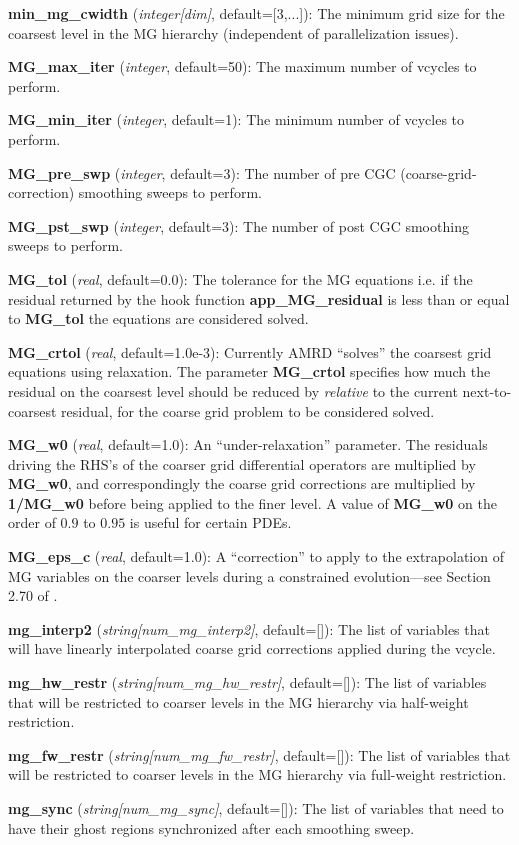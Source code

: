 \documentclass[aps,amssymb,unsortedaddress,nofootinbib]{revtex4}
\def\lsep{\itemsep 0.05in}
\begin{document}
\begin{list}{}{\lsep}
\item {\bf min\_mg\_cwidth} ({\em integer[dim]}, default=[3,...]):
      The minimum grid size for the coarsest level in the MG hierarchy (independent
      of parallelization issues).
\item {\bf MG\_max\_iter} ({\em integer}, default=50):
      The maximum number of vcycles to perform.
\item {\bf MG\_min\_iter} ({\em integer}, default=1):
      The minimum number of vcycles to perform.
\item {\bf MG\_pre\_swp} ({\em integer}, default=3):
      The number of pre CGC (coarse-grid-correction) smoothing sweeps to perform.
\item {\bf MG\_pst\_swp} ({\em integer}, default=3):
      The number of post CGC smoothing sweeps to perform.
\item {\bf MG\_tol} ({\em real}, default=0.0):
      The tolerance for the MG equations  i.e. if the residual returned by 
      the hook function {\bf app\_MG\_residual}
      is less than or equal to {\bf MG\_tol} the equations are considered solved.
\item {\bf MG\_crtol} ({\em real}, default=1.0e-3):
      Currently AMRD ``solves'' the coarsest grid equations using relaxation.
      The parameter {\bf MG\_crtol} specifies how much the residual on the coarsest
      level should be reduced by {\em relative} to the current next-to-coarsest
      residual, for the coarse grid problem to be considered solved.
\item {\bf MG\_w0} ({\em real}, default=1.0):
      An ``under-relaxation'' parameter. The residuals driving the RHS's of the
      coarser grid differential operators are multiplied by {\bf MG\_w0}, and
      correspondingly the coarse grid corrections are multiplied by {\bf 1/MG\_w0}
      before being applied to the finer level. A value of {\bf MG\_w0} on the
      order of $0.9$ to $0.95$ is useful for certain PDEs.
\item {\bf MG\_eps\_c} ({\em real}, default=1.0): A ``correction'' to apply
      to the extrapolation of MG variables on the coarser levels during
      a constrained evolution---see Section 2.70 of \cite{fpthesis}.
\item {\bf mg\_interp2} ({\em string[num\_mg\_interp2]}, default=[]):
      The list of variables that will have linearly interpolated
      coarse grid corrections applied during the vcycle.
\item {\bf mg\_hw\_restr} ({\em string[num\_mg\_hw\_restr]}, default=[]):
      The list of variables that will be restricted to coarser levels
      in the MG hierarchy via half-weight restriction.
\item {\bf mg\_fw\_restr} ({\em string[num\_mg\_fw\_restr]}, default=[]):
      The list of variables that will be restricted to coarser levels
      in the MG hierarchy via full-weight restriction.
\item {\bf mg\_sync} ({\em string[num\_mg\_sync]}, default=[]):
      The list of variables that need to have their ghost regions synchronized
      after each smoothing sweep.
\end{list}
\end{document}
